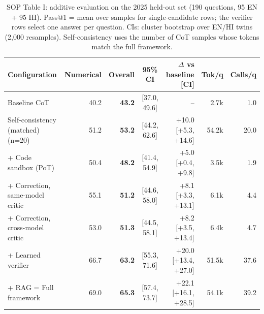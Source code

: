 \begin{table}[t]
\centering
\footnotesize
\caption{SOP Table I: additive evaluation on the 2025 held-out set (190 questions, 95 EN + 95 HI). Pass@1 = mean over samples for single-candidate rows; the verifier rows select one answer per question. CIs: cluster bootstrap over EN/HI twins (2{,}000 resamples). Self-consistency uses the number of CoT samples whose tokens match the full framework.}
\label{tab:table1}
\setlength{\tabcolsep}{3.5pt}
\begin{tabular}{lrrcrrr}
\toprule
Configuration & Numerical & Overall & 95\% CI & $\Delta$ vs baseline [CI] & Tok/q & Calls/q \\
\midrule
Baseline CoT & 40.2 & \textbf{43.2} & [37.0, 49.6] & -- & 2.7k & 1.0 \\
Self-consistency (matched) (n=20) & 51.2 & \textbf{53.2} & [44.2, 62.6] & +10.0 [+5.3, +14.6] & 54.2k & 20.0 \\
+ Code sandbox (PoT) & 50.4 & \textbf{48.2} & [41.4, 54.9] & +5.0 [+0.4, +9.8] & 3.5k & 1.9 \\
+ Correction, same-model critic & 55.1 & \textbf{51.2} & [44.6, 58.0] & +8.1 [+3.3, +13.1] & 6.1k & 4.4 \\
+ Correction, cross-model critic & 53.0 & \textbf{51.3} & [44.5, 58.1] & +8.2 [+3.5, +13.4] & 6.4k & 4.7 \\
+ Learned verifier & 66.7 & \textbf{63.2} & [55.3, 71.6] & +20.0 [+13.4, +27.0] & 51.5k & 37.6 \\
+ RAG = Full framework & 69.0 & \textbf{65.3} & [57.4, 73.7] & +22.1 [+16.1, +28.5] & 54.1k & 39.2 \\
\bottomrule
\end{tabular}
\end{table}
